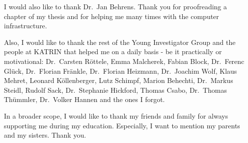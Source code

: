 I would also like to thank Dr.~Jan Behrens. Thank you for proofreading a chapter of my thesis and for helping me many times with the computer infrastructure.

Also, I would like to thank the rest of the Young Investigator Group and the people at KATRIN that helped me on a daily basis - be it practically or motivational: 
Dr.~Carsten Röttele, 
Emma Malcherek, 
Fabian Block, Dr.~Ferenc Glück, Dr.~Florian Fränkle, Dr.~Florian Heizmann,
Dr.~Joachim Wolf,
Klaus Mehret,
Leonard Köllenberger, Lutz Schimpf,
Marion Behechti, Dr.~Markus Steidl,
Rudolf Sack,
Dr.~Stephanie Hickford, 
Thomas Csabo, Dr.~Thomas Thümmler,  
Dr.~Volker Hannen 
and the ones I forgot. 


In a broader scope, I would like to thank my friends and family for always supporting me during my education. Especially, I want to mention my parents and my sisters. Thank you.